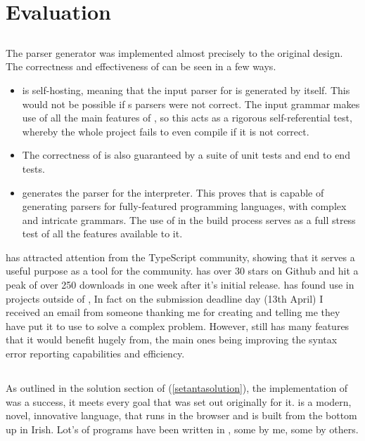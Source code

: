 \chapter{Evaluation}

\section{\tsPEG{}}

The \tsPEG{} parser generator was implemented almost precisely to the original design. The correctness and effectiveness of \tsPEG{} can be seen in a few ways.
\begin{itemize}
    \item \tsPEG{} is self-hosting, meaning that the input parser for \tsPEG{} is generated by \tsPEG{} itself. This would not be possible if \tsPEG{}s parsers were not correct. The input grammar makes use of all the main features of \tsPEG{}, so this acts as a rigorous self-referential test, whereby the whole project fails to even compile if it is not correct.
    \item The correctness of \tsPEG{} is also guaranteed by a suite of unit tests and end to end tests.
    \item \tsPEG{} generates the parser for the \Setanta{} interpreter. This proves that \tsPEG{} is capable of generating parsers for fully-featured programming languages, with complex and intricate grammars. The use of \tsPEG{} in the \Setanta{} build process serves as a full stress test of all the features available to it.
\end{itemize}

\tsPEG{} has attracted attention from the TypeScript community, showing that it serves a useful purpose as a tool for the community. \tsPEG{} has over 30 stars on Github and hit a peak of over 250 downloads in one week after it's initial release. \tsPEG{} has found use in projects outside of \Setanta{}, In fact on the submission deadline day (13th April) I received an email from someone thanking me for creating \tsPEG{} and telling me they have put it to use to solve a complex problem. However, \tsPEG{} still has many features that it would benefit hugely from, the main ones being improving the syntax error reporting capabilities and efficiency.

\section{\Setanta{}}

As outlined in the solution section of \Setanta{} (\ref{setantasolution}), the implementation of \Setanta{} was a success, it meets every goal that was set out originally for it. \Setanta{} is a modern, novel, innovative language, that runs in the browser and is built from the bottom up in Irish. Lot's of programs have been written in \Setanta{}, some by me, some by others.

